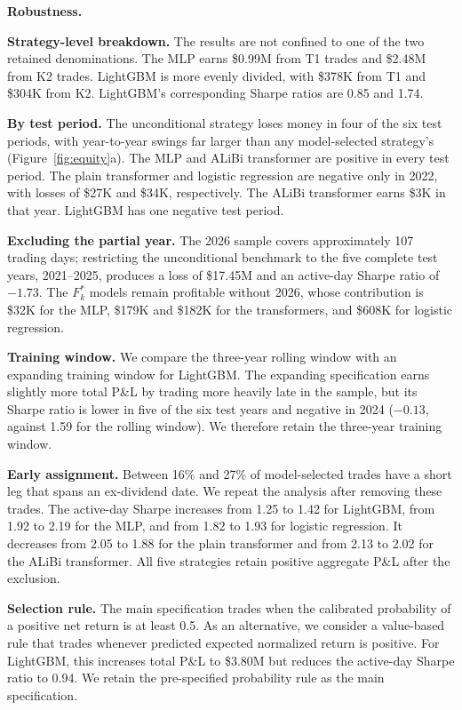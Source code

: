 \documentclass[sigconf,review,anonymous]{acmart}
\begin{document}
\smallskip\noindent\textbf{Robustness.}
\label{sec:robustness}

\noindent\textbf{Strategy-level breakdown.}
The results are not confined to one of the two retained denominations. The MLP earns \$0.99M from T1 trades and \$2.48M from K2 trades. LightGBM is more evenly divided, with \$378K from T1 and \$304K from K2. LightGBM's corresponding Sharpe ratios are 0.85 and 1.74.

\noindent\textbf{By test period.}
The unconditional strategy loses money in four of the six test periods, with year-to-year swings far larger than any model-selected strategy's (Figure~\ref{fig:equity}a). The MLP and ALiBi transformer are positive in every test period. The plain transformer and logistic regression are negative only in 2022, with losses of \$27K and \$34K, respectively. The ALiBi transformer earns \$3K in that year. LightGBM has one negative test period.

\noindent\textbf{Excluding the partial year.}
The 2026 sample covers approximately 107 trading days; restricting the unconditional benchmark to the five complete test years, 2021--2025, produces a loss of \$17.45M and an active-day Sharpe ratio of $-1.73$. The $F_k^\ast$ models remain profitable without 2026, whose contribution is \$32K for the MLP, \$179K and \$182K for the transformers, and \$608K for logistic regression.

\noindent\textbf{Training window.}
We compare the three-year rolling window with an expanding training window for LightGBM. The expanding specification earns slightly more total P\&L by trading more heavily late in the sample, but its Sharpe ratio is lower in five of the six test years and negative in 2024 ($-0.13$, against 1.59 for the rolling window). We therefore retain the three-year training window.

\noindent\textbf{Early assignment.}
Between 16\% and 27\% of model-selected trades have a short leg that spans an ex-dividend date. We repeat the analysis after removing these trades. The active-day Sharpe increases from 1.25 to 1.42 for LightGBM, from 1.92 to 2.19 for the MLP, and from 1.82 to 1.93 for logistic regression. It decreases from 2.05 to 1.88 for the plain transformer and from 2.13 to 2.02 for the ALiBi transformer. All five strategies retain positive aggregate P\&L after the exclusion.

\noindent\textbf{Selection rule.}
The main specification trades when the calibrated probability of a positive net return is at least 0.5. As an alternative, we consider a value-based rule that trades whenever predicted expected normalized return is positive. For LightGBM, this increases total P\&L to \$3.80M but reduces the active-day Sharpe ratio to 0.94. We retain the pre-specified probability rule as the main specification.
\end{document}
